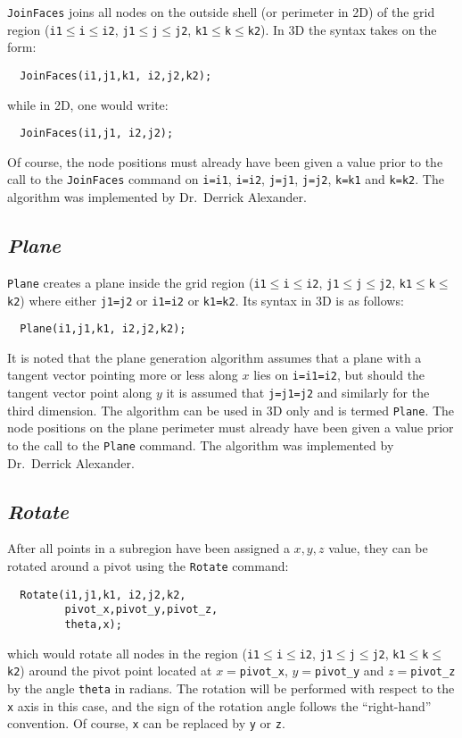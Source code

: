 \documentclass{warpdoc}
\begin{document}
\verb|JoinFaces| joins all nodes on the outside shell (or perimeter in 2D) of the
grid region (\verb|i1|$\leq$\verb|i|$\leq$\verb|i2|,
  \verb|j1|$\leq$\verb|j|$\leq$\verb|j2|,
  \verb|k1|$\leq$\verb|k|$\leq$\verb|k2|). In 3D the syntax takes on the form:
%
\begin{verbatim}
  JoinFaces(i1,j1,k1, i2,j2,k2);
\end{verbatim}
%
while in 2D, one would write:
%
\begin{verbatim}
  JoinFaces(i1,j1, i2,j2);
\end{verbatim}
%
Of course, the node positions must already have been given a value prior
to the call to the \verb|JoinFaces| command on
\verb|i=i1|, \verb|i=i2|, \verb|j=j1|, \verb|j=j2|, \verb|k=k1| and
\verb|k=k2|. The algorithm was implemented by Dr.\ Derrick Alexander.


\subsection{\emph{Plane}}

\verb|Plane| creates a plane inside the
grid region (\verb|i1|$\leq$\verb|i|$\leq$\verb|i2|,
  \verb|j1|$\leq$\verb|j|$\leq$\verb|j2|,
  \verb|k1|$\leq$\verb|k|$\leq$\verb|k2|) where either
  \verb|j1=j2| or \verb|i1=i2| or \verb|k1=k2|. Its syntax in 3D is as follows:
%
\begin{verbatim}
  Plane(i1,j1,k1, i2,j2,k2);
\end{verbatim}
%
It is noted that the plane generation algorithm  assumes that a plane
with a tangent vector pointing more or less along $x$ lies on \verb|i=i1=i2|, but
should the tangent vector point along $y$ it is assumed that \verb|j=j1=j2|
and similarly for the third dimension.
The algorithm can be used in 3D only and is termed \verb|Plane|. 
The node positions on the plane perimeter must already have been given a value prior
to the call to the \verb|Plane| command. The algorithm was 
implemented by Dr.\ Derrick Alexander.


\subsection{\emph{Rotate}}

After all points in a subregion have been assigned
a  $x,y,z$ value, they can be rotated around a pivot
using the \verb|Rotate| command:
%
\begin{verbatim}
  Rotate(i1,j1,k1, i2,j2,k2,
         pivot_x,pivot_y,pivot_z,
         theta,x);
\end{verbatim}
%
which would rotate all nodes in the region
(\verb|i1|$\leq$\verb|i|$\leq$\verb|i2|,
  \verb|j1|$\leq$\verb|j|$\leq$\verb|j2|,
  \verb|k1|$\leq$\verb|k|$\leq$\verb|k2|)
around the pivot point located at $x=$\verb|pivot_x|,
$y=$\verb|pivot_y| and $z=$\verb|pivot_z| by the angle
\verb|theta| in radians. The rotation will be performed with respect to
the \verb|x| axis in this case, and the sign of
the rotation angle follows the ``right-hand''
convention. Of course, \verb|x| can be replaced by
\verb|y| or \verb|z|.
\end{document}
